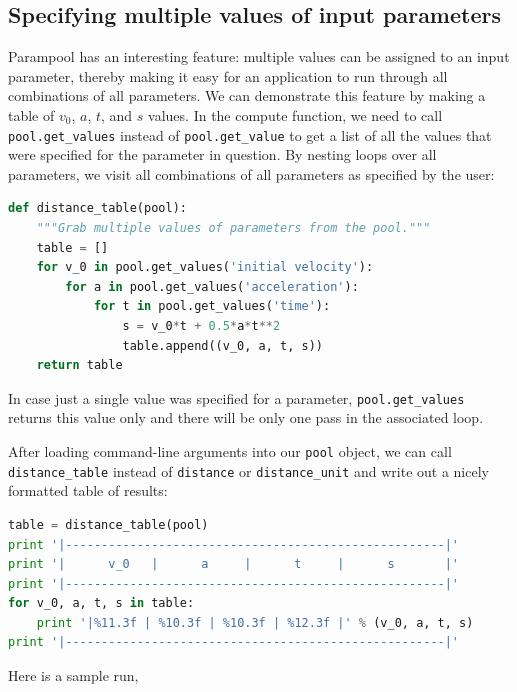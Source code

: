 \documentclass[graybox,envcountchap,sectrefs,final]{svmonodo}
\begin{document}

\subsection{Specifying multiple values of input parameters}

Parampool has an interesting feature: multiple values can be assigned
to an input parameter, thereby making it easy for an application to
run through all combinations of all parameters.
We can demonstrate this feature by making a table of $v_0$, $a$, $t$, and
$s$ values. In the compute function, we need to call \Verb!pool.get_values!
instead of \Verb!pool.get_value! to get a list of all the values that
were specified for the parameter in question. By nesting loops over
all parameters, we visit all combinations of all parameters as
specified by the user:

\begin{lstlisting}[language=Python,style=graycolor]
def distance_table(pool):
    """Grab multiple values of parameters from the pool."""
    table = []
    for v_0 in pool.get_values('initial velocity'):
        for a in pool.get_values('acceleration'):
            for t in pool.get_values('time'):
                s = v_0*t + 0.5*a*t**2
                table.append((v_0, a, t, s))
    return table
\end{lstlisting}
In case just a single value was specified for a parameter, \Verb!pool.get_values!
returns this value only and there will be only one pass in the associated
loop.

After loading command-line arguments into our \texttt{pool} object, we can call
\Verb!distance_table! instead of \texttt{distance} or \Verb!distance_unit! and
write out a nicely formatted table of results:

\begin{lstlisting}[language=Python,style=graycolor]
table = distance_table(pool)
print '|-----------------------------------------------------|'
print '|      v_0   |      a     |      t     |      s       |'
print '|-----------------------------------------------------|'
for v_0, a, t, s in table:
    print '|%11.3f | %10.3f | %10.3f | %12.3f |' % (v_0, a, t, s)
print '|-----------------------------------------------------|'
\end{lstlisting}
Here is a sample run,
\end{document}
